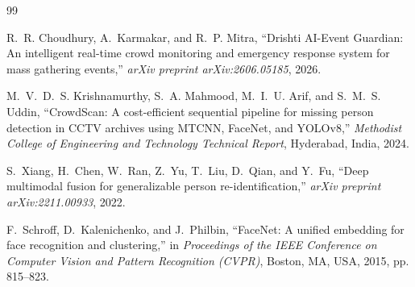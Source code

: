 \documentclass[12pt,a4paper]{report}
\begin{document}
\newpage
\begin{thebibliography}{99}

R.~R. Choudhury, A.~Karmakar, and R.~P. Mitra, ``Drishti AI-Event Guardian: An intelligent real-time crowd monitoring and emergency response system for mass gathering events,'' \textit{arXiv preprint arXiv:2606.05185}, 2026.

M.~V.~D.~S. Krishnamurthy, S.~A. Mahmood, M.~I.~U. Arif, and S.~M.~S. Uddin, ``CrowdScan: A cost-efficient sequential pipeline for missing person detection in CCTV archives using MTCNN, FaceNet, and YOLOv8,'' \textit{Methodist College of Engineering and Technology Technical Report}, Hyderabad, India, 2024.

S.~Xiang, H.~Chen, W.~Ran, Z.~Yu, T.~Liu, D.~Qian, and Y.~Fu, ``Deep multimodal fusion for generalizable person re-identification,'' \textit{arXiv preprint arXiv:2211.00933}, 2022.

F.~Schroff, D.~Kalenichenko, and J.~Philbin, ``FaceNet: A unified embedding for face recognition and clustering,'' in \textit{Proceedings of the IEEE Conference on Computer Vision and Pattern Recognition (CVPR)}, Boston, MA, USA, 2015, pp. 815--823.

\end{thebibliography}
\end{document}
